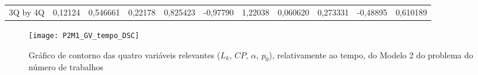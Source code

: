 \begin{table}[H]
{\begin{tabular}{lllllllllll}
\rowcolor[HTML]{FFFFFF} 
3Q by 4Q       & {\color[HTML]{333333} 0,12124}  & {\color[HTML]{333333} 0,546661} & {\color[HTML]{333333} 0,22178}  & {\color[HTML]{333333} 0,825423} & {\color[HTML]{333333} -0,97790} & {\color[HTML]{333333} 1,22038}  & {\color[HTML]{333333} 0,060620}  & {\color[HTML]{333333} 0,273331} & {\color[HTML]{333333} -0,48895} & {\color[HTML]{333333} 0,610189} 
\end{tabular}
}
\end{table}

\begin{figure}[H]
\caption{Gráfico de contorno das quatro variáveis relevantes ($L_{k}$, $CP$, $\alpha$, $p_{0}$), relativamente ao tempo, do Modelo 2 do problema do número de trabalhos}
\centering
\texttt{[image: P2M1\_GV\_tempo\_DSC]}
\end{figure}



